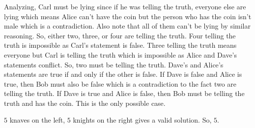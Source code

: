 \documentclass[11pt]{article}
\begin{document}
\begin{sol}
Analyzing, Carl must be lying since if he was telling the truth, everyone else are lying which means Alice can't have the coin but the person who has the coin isn't male which is a contradiction. Also note that all of them can't be lying by similar reasoning. So, either two, three, or four are telling the truth. Four telling the truth is impossible as Carl's statement is false. Three telling the truth means everyone but Carl is telling the truth which is impossible as Alice and Dave's statements conflict. So, two must be telling the truth. Dave's and Alice's statements are true if and only if the other is false. If Dave is false and Alice is true, then Bob must also be false which is a contradiction to the fact two are telling the truth. If Dave is true and Alice is false, then Bob must be telling the truth and  has the coin. This is the only possible case.
\end{sol}


\begin{sol}
$5$ knaves on the left, $5$ knights on the right gives a valid solution. So, $\boxed{5}$.
\end{sol}
\end{document}
